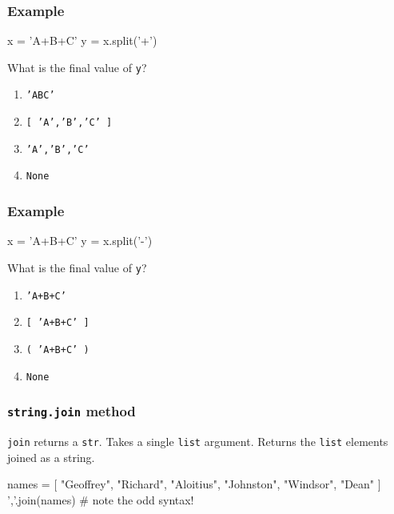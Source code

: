 \documentclass[11pt]{beamer}
\begin{document}
\begin{frame}[fragile]
  \frametitle{Example}
  \Enlarge

  \begin{semiverbatim}
x = 'A+B+C'
y = x.split('+')
  \end{semiverbatim}
  What is the final value of \texttt{y}?
  \begin{enumerate}[label=\Alph*]
  \item  \texttt{'ABC'}
  \item  \texttt{[ 'A','B','C' ]}
  \item  \texttt{'A','B','C'}
  \item  \texttt{None}
  \end{enumerate}
\end{frame}

\begin{frame}[fragile]
  \frametitle{Example}
  \Enlarge

  \begin{semiverbatim}
x = 'A+B+C'
y = x.split('-')
  \end{semiverbatim}
  What is the final value of \texttt{y}?
  \begin{enumerate}[label=\Alph*]
  \item  \texttt{'A+B+C'}
  \item  \texttt{[ 'A+B+C' ]}
  \item  \texttt{( 'A+B+C' )}
  \item  \texttt{None}
  \end{enumerate}
\end{frame}

\begin{frame}[fragile]
  \frametitle{\texttt{string.join} method}
  \Enlarge

  \begin{itemize}
  \myitem  \texttt{join} returns a \texttt{str}.
  \myitem  Takes a single \texttt{list} argument.
  \myitem  Returns the \texttt{list} elements joined as a string.
  \end{itemize}
  \begin{semiverbatim}
names = [ "Geoffrey", "Richard", "Aloitius", "Johnston", "Windsor", "Dean" ]
','.join(names)     # note the odd syntax!
  \end{semiverbatim}
\end{frame}
\end{document}
